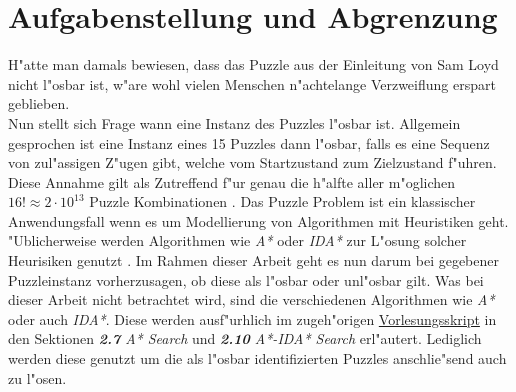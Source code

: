 \section{Aufgabenstellung und Abgrenzung} %
\label{cha:Aufgabenstellung}
H"atte man damals bewiesen, dass das Puzzle aus der Einleitung von Sam Loyd nicht l"osbar ist, w"are wohl vielen Menschen n"achtelange Verzweiflung erspart geblieben.\\
Nun stellt sich Frage wann eine Instanz des Puzzles l"osbar ist. Allgemein gesprochen ist eine Instanz eines 15 Puzzles dann l"osbar, falls es eine Sequenz von zul"assigen Z"ugen gibt, welche vom Startzustand zum Zielzustand f"uhren.\\
Diese Annahme gilt als Zutreffend f"ur genau die h"alfte aller m"oglichen $16! \approx 2 \cdot 10^{13}$ Puzzle Kombinationen \autocite{sliding-piece-puzzels:book,solving-15-puzzle-lvi:article}.
Das Puzzle Problem ist ein klassischer Anwendungsfall wenn es um Modellierung von Algorithmen mit Heuristiken geht. "Ublicherweise werden Algorithmen wie \textit{A*} oder \textit{IDA*} zur L"osung solcher Heurisiken genutzt \autocite{wiki-15-puzzle:online,solving-15-puzzle-lvi:article, depth-first-id:article}.
Im Rahmen dieser Arbeit geht es nun darum bei gegebener Puzzleinstanz vorherzusagen, ob diese als l"osbar oder unl"osbar gilt.
Was bei dieser Arbeit nicht betrachtet wird, sind die verschiedenen Algorithmen wie \textit{A*} oder auch \textit{IDA*}. Diese werden ausf"urhlich im zugeh"origen \textcolor{violet}{\href{https://github.com/karlstroetmann/Artificial-Intelligence/blob/master/Lecture-Notes/artificial-intelligence.pdf}{Vorlesungsskript}} \autocite{github-stroetmann:online} in den Sektionen \textit{\textbf{2.7} A* Search} und \textit{\textbf{2.10} A*-IDA* Search} erl"autert.
Lediglich werden diese genutzt um die als l"osbar identifizierten Puzzles anschlie"send auch zu l"osen.



